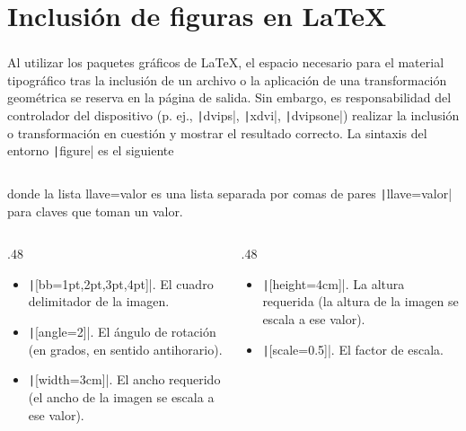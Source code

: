 \section{Inclusión de figuras en \LaTeX}

\begin{frame}[fragile]
	\frametitle{\secname}

	Al utilizar los paquetes gráficos de \LaTeX, el espacio necesario
	para el material tipográfico tras la inclusión de un archivo o la
	aplicación de una transformación geométrica se reserva en la página
	de salida.
	Sin embargo, es responsabilidad del controlador del dispositivo
	(p. ej., \texttt|dvips|, \texttt|xdvi|,
	\texttt|dvipsone|) realizar la inclusión o
	transformación en cuestión y mostrar el resultado correcto.
	La sintaxis del entorno \texttt|figure| es el siguiente
	\inputminted[fontsize=\tiny,frame=single]{latex}{sections/figure.tex}
	donde la lista llave=valor es una lista separada por comas de
	pares \texttt|llave=valor| para claves que toman un
	valor.
	\begin{columns}
		\begin{column}{.48\paperwidth}
			\begin{itemize}
				\item

				      \texttt|[bb={1pt,2pt,3pt,4pt}]|.
				      El cuadro delimitador de la imagen.

				\item

				      \texttt|[angle=2]|.
				      El ángulo de rotación (en grados, en sentido
				      antihorario).

				\item

				      \texttt|[width=3cm]|.
				      El ancho requerido (el ancho de la imagen se escala a
				      ese valor).
			\end{itemize}
		\end{column}
		\begin{column}{.48\paperwidth}
			\begin{itemize}
				\item

				      \texttt|[height=4cm]|.
				      La altura requerida (la altura de la imagen se escala a
				      ese valor).

				\item

				      \texttt|[scale=0.5]|.
				      El factor de escala.


\end{itemize}
\end{column}
\end{columns}
\end{frame}
